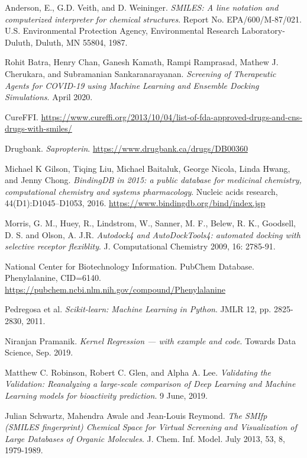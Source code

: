 \documentclass[11pt]{article}
\begin{document}
    \begin{thebibliography}{9}
    
Anderson, E., G.D. Veith, and D. Weininger.
\textit{SMILES: A line notation and computerized interpreter for chemical structures}.
Report No. EPA/600/M-87/021. U.S. Environmental Protection Agency, Environmental Research Laboratory-Duluth, Duluth, MN 55804, 1987.

Rohit Batra, Henry Chan, Ganesh Kamath, Rampi Ramprasad, Mathew J. Cherukara, and Subramanian Sankaranarayanan.
\textit{Screening of Therapeutic Agents for COVID-19 using Machine Learning and Ensemble Docking Simulations}.
April 2020.

CureFFI.
\url{https://www.cureffi.org/2013/10/04/list-of-fda-approved-drugs-and-cns-drugs-with-smiles/}

Drugbank.
\textit{Sapropterin}.
\url{https://www.drugbank.ca/drugs/DB00360}


Michael K Gilson, Tiqing Liu, Michael Baitaluk, George Nicola, Linda Hwang, and Jenny Chong.
\textit{BindingDB in 2015: a public database for medicinal chemistry, computational chemistry and systems pharmacology}.
Nucleic acids research, 44(D1):D1045–D1053, 2016.
\url{https://www.bindingdb.org/bind/index.jsp}

Morris, G. M., Huey, R., Lindstrom, W., Sanner, M. F., Belew, R. K., Goodsell, D. S. and Olson, A. J.R.
\textit{Autodock4 and AutoDockTools4: automated docking with selective receptor flexiblity}.
J. Computational Chemistry 2009, 16: 2785-91.

National Center for Biotechnology Information.
PubChem Database. Phenylalanine, CID=6140.
\url{https://pubchem.ncbi.nlm.nih.gov/compound/Phenylalanine}

Pedregosa et al.
\textit{Scikit-learn: Machine Learning in Python}.
JMLR 12, pp. 2825-2830, 2011.

Niranjan Pramanik.
\textit{Kernel Regression — with example and code}.
Towards Data Science, Sep. 2019.

Matthew C. Robinson, Robert C. Glen, and Alpha A. Lee.
\textit{Validating the Validation: Reanalyzing a large-scale comparison of Deep Learning and Machine Learning models for bioactivity prediction}.
9 June, 2019.

Julian Schwartz, Mahendra Awale and Jean-Louis Reymond.
\textit{The SMIfp (SMILES fingerprint) Chemical Space for Virtual Screening and Visualization of Large Databases of Organic Molecules}.
J. Chem. Inf. Model. July 2013, 53, 8, 1979-1989.


\end{thebibliography}
\end{document}
